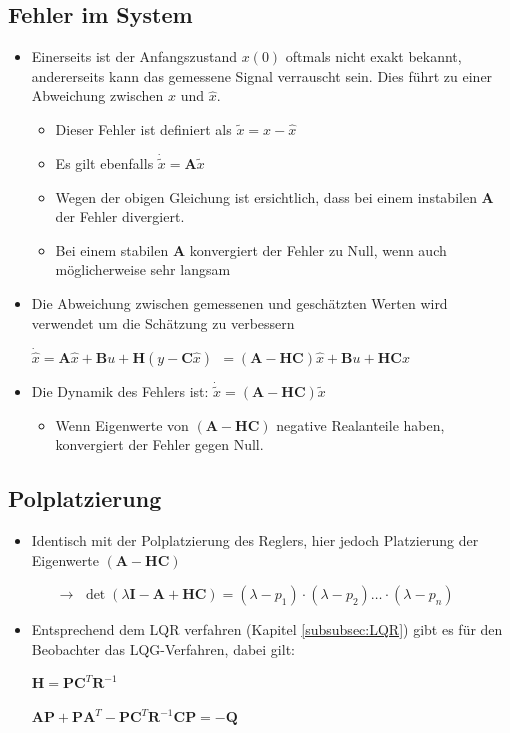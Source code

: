 \subsection{Fehler im System}
\begin{itemize}
	\item Einerseits ist der Anfangszustand $x(0)$ oftmals nicht exakt bekannt, andererseits kann das gemessene Signal verrauscht sein. Dies führt zu einer Abweichung zwischen $x$ und $\hat{x}$.
	\begin{itemize}
		\item Dieser Fehler ist definiert als $\tilde{x} = x-\hat{x}$
		\item Es gilt ebenfalls $\dot{\tilde{x}} = \boldsymbol{A}\tilde{x}$
		\item Wegen der obigen Gleichung ist ersichtlich, dass bei einem instabilen $\boldsymbol{A}$ der Fehler divergiert.
		\item Bei einem stabilen $\boldsymbol{A}$ konvergiert der Fehler zu Null, wenn auch möglicherweise sehr langsam
	\end{itemize}
	\item  Die Abweichung zwischen gemessenen und geschätzten Werten wird verwendet um die Schätzung zu verbessern
	\item[] $\dot{\hat{x}} = \boldsymbol{A}\hat{x}+\boldsymbol{B}u+\boldsymbol{H}\left(y-\boldsymbol{C}\hat{x}\right)
	~~= \left(\boldsymbol{A}-\boldsymbol{HC}\right)\hat{x}+\boldsymbol{B}u+\boldsymbol{HC}x$
	\item Die Dynamik des Fehlers ist:  $\dot{\tilde{x}} = \left(\boldsymbol{A}-\boldsymbol{HC}\right)\tilde{x}$ 
	\begin{itemize}
		\item  Wenn Eigenwerte von $\left(\boldsymbol{A}-\boldsymbol{HC}\right)$ negative Realanteile haben, konvergiert der Fehler gegen Null.
	\end{itemize}
\end{itemize}

\subsection{Polplatzierung}
\begin{itemize}
	\item Identisch mit der Polplatzierung des Reglers, hier jedoch Platzierung der Eigenwerte $\left(\boldsymbol{A}-\boldsymbol{HC}\right)$
	\begin{itemize}
		\item [$\rightarrow$] $\det\left(\lambda \boldsymbol{I}-\boldsymbol{A}+\boldsymbol{HC}\right) = \left(\lambda-p_1\right)\cdot\left(\lambda-p_2\right)\ldots\cdot\left(\lambda-p_n\right)$
	\end{itemize}
	\item Entsprechend dem LQR verfahren (Kapitel \ref{subsubsec:LQR}) gibt es für den Beobachter das LQG-Verfahren, dabei gilt:
	\item[] $\boldsymbol{H} = \boldsymbol{PC}^T\boldsymbol{R}^{-1}$
	\item[] $\boldsymbol{AP}+\boldsymbol{PA}^T-\boldsymbol{PC}^T\boldsymbol{R}^{-1}\boldsymbol{CP} = -\boldsymbol{Q}$
\end{itemize}

